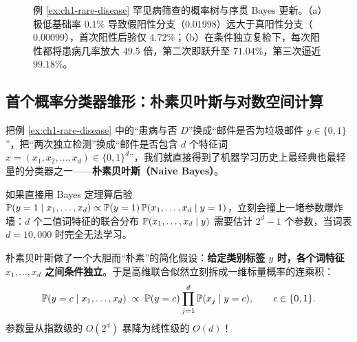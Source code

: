 \begin{figure}[htbp]
  \caption{例 \ref{ex:ch1-rare-disease} 罕见病筛查的概率树与序贯 Bayes 更新。（a）极低基础率 $0.1\%$ 导致假阳性分支（$0.01998$）远大于真阳性分支（$0.00099$），首次阳性后验仅 $4.72\%$；（b）在条件独立复检下，每次阳性都将患病几率放大 $49.5$ 倍，第二次即跃升至 $71.04\%$，第三次逼近 $99.18\%$。}
  \label{fig:ch1-bayes-update}
\end{figure}

\subsection{首个概率分类器雏形：朴素贝叶斯与对数空间计算}

把例 \ref{ex:ch1-rare-disease} 中的“患病与否 $D$”换成“邮件是否为垃圾邮件 $y \in \{0, 1\}$”，把“两次独立检测”换成“邮件是否包含 $d$ 个特征词 $x = (x_1, x_2, \dots, x_d) \in \{0, 1\}^d$”，我们就直接得到了机器学习历史上最经典也最轻量的分类器之一——\textbf{朴素贝叶斯（Naive Bayes）}。

如果直接用 Bayes 定理算后验 $\mathbb{P}(y=1 \mid x_1, \dots, x_d) \propto \mathbb{P}(y=1)\,\mathbb{P}(x_1, \dots, x_d \mid y=1)$，立刻会撞上一堵参数爆炸墙：$d$ 个二值词特征的联合分布 $\mathbb{P}(x_1, \dots, x_d \mid y)$ 需要估计 $2^d - 1$ 个参数，当词表 $d = 10{,}000$ 时完全无法学习。

朴素贝叶斯做了一个大胆而“朴素”的简化假设：\textbf{给定类别标签 $y$ 时，各个词特征 $x_1, \dots, x_d$ 之间条件独立}。于是高维联合似然立刻拆成一维标量概率的连乘积：
\begin{equation}
  \mathbb{P}(y = c \mid x_1, \dots, x_d)
  \;\propto\; \mathbb{P}(y = c) \prod_{j=1}^d \mathbb{P}(x_j \mid y = c), \qquad c \in \{0, 1\}.
  \label{eq:ch1-naive-bayes}
\end{equation}
参数量从指数级的 $O(2^d)$ 暴降为线性级的 $O(d)$！

